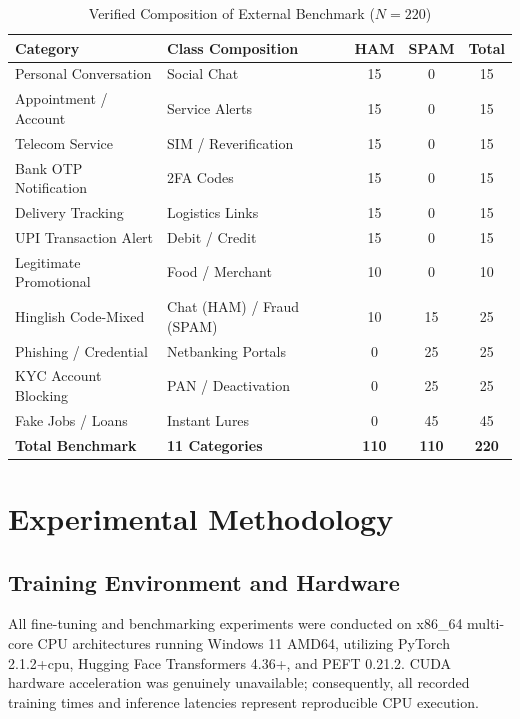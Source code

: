 \documentclass[conference]{IEEEtran}
\begin{document}
\begin{table}[t]
\caption{Verified Composition of External Benchmark ($N=220$)}
\label{tab:benchmark_categories}
\centering
\begin{tabularx}{\columnwidth}{lXccc}
\toprule
\textbf{Category} & \textbf{Class Composition} & \textbf{HAM} & \textbf{SPAM} & \textbf{Total} \\
\midrule
Personal Conversation & Social Chat & 15 & 0 & 15 \\
Appointment / Account & Service Alerts & 15 & 0 & 15 \\
Telecom Service & SIM / Reverification & 15 & 0 & 15 \\
Bank OTP Notification & 2FA Codes & 15 & 0 & 15 \\
Delivery Tracking & Logistics Links & 15 & 0 & 15 \\
UPI Transaction Alert & Debit / Credit & 15 & 0 & 15 \\
Legitimate Promotional & Food / Merchant & 10 & 0 & 10 \\
Hinglish Code-Mixed & Chat (HAM) / Fraud (SPAM) & 10 & 15 & 25 \\
Phishing / Credential & Netbanking Portals & 0 & 25 & 25 \\
KYC Account Blocking & PAN / Deactivation & 0 & 25 & 25 \\
Fake Jobs / Loans & Instant Lures & 0 & 45 & 45 \\
\midrule
\textbf{Total Benchmark} & \textbf{11 Categories} & \textbf{110} & \textbf{110} & \textbf{220} \\
\bottomrule
\end{tabularx}
\end{table}

\section{Experimental Methodology}
\label{sec:methodology}

\subsection{Training Environment and Hardware}
All fine-tuning and benchmarking experiments were conducted on x86\_64 multi-core CPU architectures running Windows 11 AMD64, utilizing PyTorch 2.1.2+cpu, Hugging Face Transformers 4.36+, and PEFT 0.21.2. CUDA hardware acceleration was genuinely unavailable; consequently, all recorded training times and inference latencies represent reproducible CPU execution.
\end{document}
